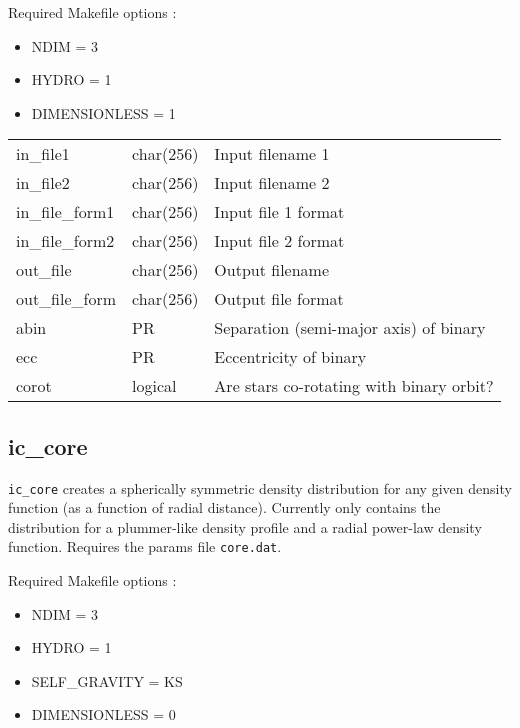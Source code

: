 \documentclass[a4paper]{article}
\newcommand{\var}[1]{\texttt{#1}}
\begin{document}
\noindent Required Makefile options :
\begin{itemize}
\item NDIM = 3
\item HYDRO = 1
\item DIMENSIONLESS = 1
\end{itemize}
\vspace{0.1cm}

\tabletail{\hline}
\tablelasttail{\hline}
\begin{center}
\begin{supertabular}{|p{3cm}|p{2cm}|p{8cm}|}
in\_file1        & char(256) & Input filename 1 \\
in\_file2        & char(256) & Input filename 2 \\
in\_file\_form1  & char(256) & Input file 1 format \\
in\_file\_form2  & char(256) & Input file 2 format \\
out\_file        & char(256) & Output filename \\
out\_file\_form  & char(256) & Output file format \\
abin             & PR        & Separation (semi-major axis) of binary \\
ecc		 & PR        & Eccentricity of binary \\
corot            & logical   & Are stars co-rotating with binary orbit? \\
\end{supertabular}
\end{center}



\subsection{ic\_core}
\var{ic\_core} creates a spherically symmetric density distribution for any given density function (as a function of radial distance).  Currently only contains the distribution for a plummer-like density profile and a radial power-law density function.  Requires the params file \var{core.dat}. \newline

\noindent Required Makefile options :
\begin{itemize}
\item NDIM = 3
\item HYDRO = 1
\item SELF\_GRAVITY = KS
\item DIMENSIONLESS = 0
\end{itemize}
\end{document}
